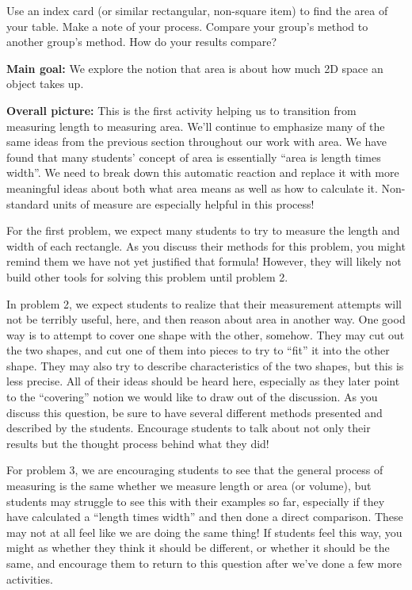 \documentclass[nooutcomes,noauthor]{ximera}
\begin{document}
\begin{problem}
Use an index card (or similar rectangular, non-square item) to find the area of your table.  Make a note of your process.  Compare your group's method to another group's method.  How do your results compare?

\end{problem}



\pagebreak


\begin{instructorNotes}
{\bf Main goal:} We explore the notion that area is about how much 2D space an object takes up.

{\bf Overall picture:}
This is the first activity helping us to transition from measuring length to measuring area. We'll continue to emphasize many of the same ideas from the previous section throughout our work with area. We have found that many students' concept of area is essentially ``area is length times width''. We need to break down this automatic reaction and replace it with more meaningful ideas about both what area means as well as how to calculate it. Non-standard units of measure are especially helpful in this process!

For the first problem, we expect many students to try to measure the length and width of each rectangle. As you discuss their methods for this problem, you might remind them we have not yet justified that formula! However, they will likely not build other tools for solving this problem until problem 2.

In problem 2, we expect students to realize that their measurement attempts will not be terribly useful, here, and then reason about area in another way.  One good way is to attempt to cover one shape with the other, somehow. They may cut out the two shapes, and cut one of them into pieces to try to ``fit'' it into the other shape. They may also try to describe characteristics of the two shapes, but this is less precise. All of their ideas should be heard here, especially as they later point to the ``covering'' notion we would like to draw out of the discussion. As you discuss this question, be sure to have several different methods presented and described by the students. Encourage students to talk about not only their results but the thought process behind what they did!

For problem 3, we are encouraging students to see that the general process of measuring is the same whether we measure length or area (or volume), but students may struggle to see this with their examples so far, especially if they have calculated a ``length times width'' and then done a direct comparison. These may not at all feel like we are doing the same thing! If students feel this way, you might as whether they think it should be different, or whether it should be the same, and encourage them to return to this question after we've done a few more activities.


\end{instructorNotes}
\end{document}

